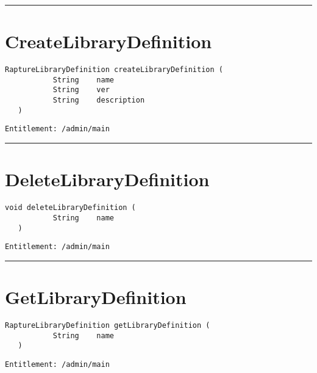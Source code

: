 \rule{12cm}{2pt}
\section{CreateLibraryDefinition}
\label{Api:CreateLibraryDefinition}
\begin{lstlisting}[style=nonumbers]
   RaptureLibraryDefinition createLibraryDefinition (
           String    name
           String    ver
           String    description
   )
\end{lstlisting}
\begin{Verbatim}[formatcom=\color{Maroon}]
  Entitlement: /admin/main
\end{Verbatim}



\rule{12cm}{2pt}
\section{DeleteLibraryDefinition}
\label{Api:DeleteLibraryDefinition}
\begin{lstlisting}[style=nonumbers]
   void deleteLibraryDefinition (
           String    name
   )
\end{lstlisting}
\begin{Verbatim}[formatcom=\color{Maroon}]
  Entitlement: /admin/main
\end{Verbatim}



\rule{12cm}{2pt}
\section{GetLibraryDefinition}
\label{Api:GetLibraryDefinition}
\begin{lstlisting}[style=nonumbers]
   RaptureLibraryDefinition getLibraryDefinition (
           String    name
   )
\end{lstlisting}
\begin{Verbatim}[formatcom=\color{Maroon}]
  Entitlement: /admin/main
\end{Verbatim}




